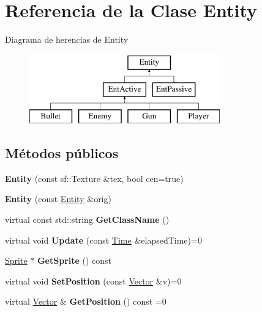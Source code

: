 \hypertarget{classEntity}{\section{Referencia de la Clase Entity}
\label{classEntity}
}
Diagrama de herencias de Entity\begin{figure}[H]
\begin{center}
\leavevmode
\includegraphics[height=3.000000cm]{classEntity}
\end{center}
\end{figure}
\subsection*{Métodos públicos}
\begin{DoxyCompactItemize}
\item 
\hypertarget{classEntity_a003b768b26fc58c86db1bebf4d9e6dc0}{{\bfseries Entity} (const sf\-::\-Texture \&tex, bool cen=true)}\label{classEntity_a003b768b26fc58c86db1bebf4d9e6dc0}

\item 
\hypertarget{classEntity_a9de139ff12775dd95fb80bec08247de7}{{\bfseries Entity} (const \hyperlink{classEntity}{Entity} \&orig)}\label{classEntity_a9de139ff12775dd95fb80bec08247de7}

\item 
\hypertarget{classEntity_a4c91428df1de64d453403259528d0cf5}{virtual const std\-::string {\bfseries Get\-Class\-Name} ()}\label{classEntity_a4c91428df1de64d453403259528d0cf5}

\item 
\hypertarget{classEntity_a8bee0e0ef049bede8b99ed8adf449e05}{virtual void {\bfseries Update} (const \hyperlink{classTime}{Time} \&elapsed\-Time)=0}\label{classEntity_a8bee0e0ef049bede8b99ed8adf449e05}

\item 
\hypertarget{classEntity_aae98125c6edca41264a3992987937865}{\hyperlink{classSprite}{Sprite} $\ast$ {\bfseries Get\-Sprite} () const }\label{classEntity_aae98125c6edca41264a3992987937865}

\item 
\hypertarget{classEntity_a0910fd995e8c73bf6c48d42c04e15ec3}{virtual void {\bfseries Set\-Position} (const \hyperlink{classVector}{Vector} \&v)=0}\label{classEntity_a0910fd995e8c73bf6c48d42c04e15ec3}

\item 
\hypertarget{classEntity_a1a88f8b1352ab1e53faffcfab9931a61}{virtual \hyperlink{classVector}{Vector} \& {\bfseries Get\-Position} () const =0}\label{classEntity_a1a88f8b1352ab1e53faffcfab9931a61}

\end{DoxyCompactItemize}
